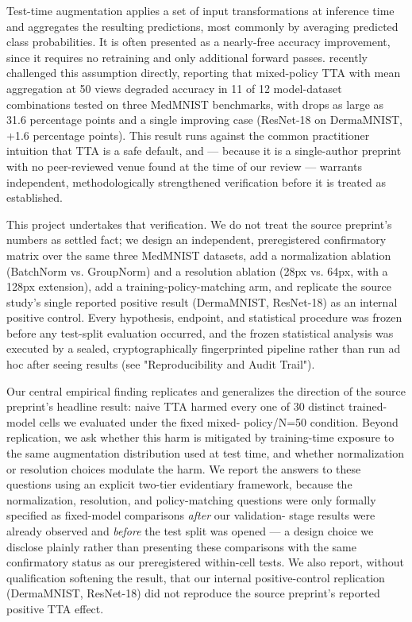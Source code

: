 Test-time augmentation applies a set of input transformations at inference time and aggregates the resulting predictions, most commonly by averaging predicted class probabilities. It is often presented as a nearly-free accuracy improvement, since it requires no retraining and only additional forward passes. \citet{medeiros2026tta} recently challenged this assumption directly, reporting that mixed-policy TTA with mean aggregation at 50 views degraded accuracy in 11 of 12 model-dataset combinations tested on three MedMNIST benchmarks, with drops as large as 31.6 percentage points and a single improving case (ResNet-18 on DermaMNIST, +1.6 percentage points). This result runs against the common practitioner intuition that TTA is a safe default, and --- because it is a single-author preprint with no peer-reviewed venue found at the time of our review --- warrants independent, methodologically strengthened verification before it is treated as established.

This project undertakes that verification. We do not treat the source preprint's numbers as settled fact; we design an independent, preregistered confirmatory matrix over the same three MedMNIST datasets, add a normalization ablation (BatchNorm vs. GroupNorm) and a resolution ablation (28px vs. 64px, with a 128px extension), add a training-policy-matching arm, and replicate the source study's single reported positive result (DermaMNIST, ResNet-18) as an internal positive control. Every hypothesis, endpoint, and statistical procedure was frozen before any test-split evaluation occurred, and the frozen statistical analysis was executed by a sealed, cryptographically fingerprinted pipeline rather than run ad hoc after seeing results (see "Reproducibility and Audit Trail").

Our central empirical finding replicates and generalizes the direction of the source preprint's headline result: naive TTA harmed every one of 30 distinct trained-model cells we evaluated under the fixed mixed- policy/N=50 condition. Beyond replication, we ask whether this harm is mitigated by training-time exposure to the same augmentation distribution used at test time, and whether normalization or resolution choices modulate the harm. We report the answers to these questions using an explicit two-tier evidentiary framework, because the normalization, resolution, and policy-matching questions were only formally specified as fixed-model comparisons \emph{after} our validation- stage results were already observed and \emph{before} the test split was opened --- a design choice we disclose plainly rather than presenting these comparisons with the same confirmatory status as our preregistered within-cell tests. We also report, without qualification softening the result, that our internal positive-control replication (DermaMNIST, ResNet-18) did not reproduce the source preprint's reported positive TTA effect.

